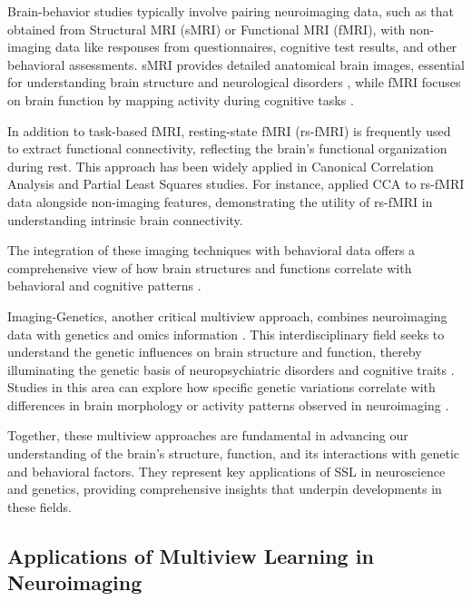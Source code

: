 Brain-behavior studies typically involve pairing neuroimaging data, such as that obtained from Structural MRI (sMRI) or Functional MRI (fMRI), with non-imaging data like responses from questionnaires, cognitive test results, and other behavioral assessments.
sMRI provides detailed anatomical brain images, essential for understanding brain structure and neurological disorders \citep{kanai2011structural}, while fMRI focuses on brain function by mapping activity during cognitive tasks \citep{miranda2021systematic}.

In addition to task-based fMRI, resting-state fMRI (rs-fMRI) is frequently used to extract functional connectivity, reflecting the brain's functional organization during rest. This approach has been widely applied in Canonical Correlation Analysis and Partial Least Squares studies. For instance, \citet{smith2015positive} applied CCA to rs-fMRI data alongside non-imaging features, demonstrating the utility of rs-fMRI in understanding intrinsic brain connectivity.

The integration of these imaging techniques with behavioral data offers a comprehensive view of how brain structures and functions correlate with behavioral and cognitive patterns \citep{rypma2001age,genon2022linking}.

Imaging-Genetics, another critical multiview approach, combines neuroimaging data with genetics and omics information \citep{le2008sparse}.
This interdisciplinary field seeks to understand the genetic influences on brain structure and function, thereby illuminating the genetic basis of neuropsychiatric disorders and cognitive traits \citep{bogdan2017imaging}.
Studies in this area can explore how specific genetic variations correlate with differences in brain morphology or activity patterns observed in neuroimaging \citep{liu2014review}.

Together, these multiview approaches are fundamental in advancing our understanding of the brain's structure, function, and its interactions with genetic and behavioral factors.
They represent key applications of SSL in neuroscience and genetics, providing comprehensive insights that underpin developments in these fields.

\subsection{Applications of Multiview Learning in Neuroimaging}

